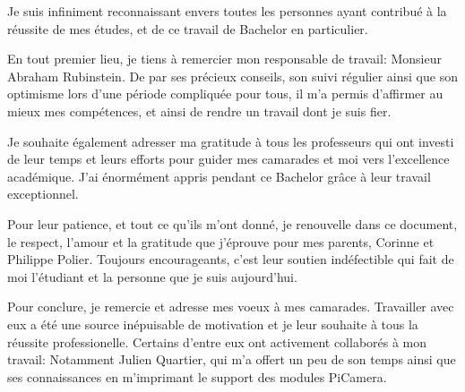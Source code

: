 Je suis infiniment reconnaissant envers toutes les personnes ayant contribué à la réussite de mes
études, et de ce travail de Bachelor en particulier.

En tout premier lieu, je tiens à remercier mon responsable de travail: Monsieur Abraham Rubinstein.
De par ses précieux conseils, son suivi régulier ainsi que son optimisme lors d'une période compliquée pour tous, il m'a permis
d'affirmer au mieux mes compétences, et ainsi de rendre un travail dont je suis fier.

Je souhaite également adresser ma gratitude à tous les professeurs qui ont investi de leur temps et leurs efforts pour
guider mes camarades et moi vers l'excellence académique. J'ai énormément appris pendant ce Bachelor grâce à leur travail exceptionnel.

Pour leur patience, et tout ce qu'ils m'ont donné, je renouvelle dans ce document, le respect, l'amour et la gratitude que j'éprouve pour mes parents, Corinne et Philippe Polier.
Toujours encourageants, c'est leur soutien indéfectible qui fait de moi l'étudiant et la personne que je suis aujourd'hui.

Pour conclure, je remercie et adresse mes voeux à mes camarades. 
Travailler avec eux a été une source inépuisable de motivation et je leur souhaite à tous la réussite professionelle.
Certains d'entre eux ont activement collaborés à mon travail: Notamment Julien Quartier, qui m'a offert un peu de son temps ainsi que ses connaissances
en m'imprimant le support des modules PiCamera.



